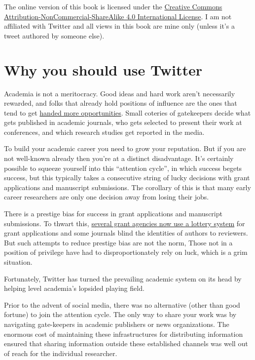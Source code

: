 \documentclass[
]{book}
\begin{document}
The online version of this book is licensed under the \href{https://creativecommons.org/licenses/by-nc-sa/4.0/}{Creative Commons Attribution-NonCommercial-ShareAlike 4.0 International License}. I am not affiliated with Twitter and all views in this book are mine only (unless it's a tweet authored by someone else).

\hypertarget{why-you-should-use-twitter}{%
\chapter{Why you should use Twitter}\label{why-you-should-use-twitter}}

Academia is not a meritocracy. Good ideas and hard work aren't necessarily rewarded, and folks that already hold positions of influence are the ones that tend to get \href{https://www.ncbi.nlm.nih.gov/pmc/articles/PMC3017158/}{handed more opportunities}. Small coteries of gatekeepers decide what gets published in academic journals, who gets selected to present their work at conferences, and which research studies get reported in the media.

To build your academic career you need to grow your reputation. But if you are not well-known already then you're at a distinct disadvantage. It's certainly possible to squeeze yourself into this ``attention cycle'', in which success begets success, but this typically takes a consecutive string of lucky decisions with grant applications and manuscript submissions. The corollary of this is that many early career researchers are only one decision away from losing their jobs.

There is a prestige bias for success in grant applications and manuscript submissions. To thwart this, \href{https://www.nature.com/articles/d41586-019-03572-7}{several grant agencies now use a lottery system} for grant applications and some journals blind the identities of authors to reviewers. But such attempts to reduce prestige bias are not the norm, Those not in a position of privilege have had to disproportionately rely on luck, which is a grim situation.

Fortunately, Twitter has turned the prevailing academic system on its head by helping level academia's lopsided playing field.

Prior to the advent of social media, there was no alternative (other than good fortune) to join the attention cycle. The only way to share your work was by navigating gate-keepers in academic publishers or news organizations. The enormous cost of maintaining these infrastructures for distributing information ensured that sharing information outside these established channels was well out of reach for the individual researcher.
\end{document}
